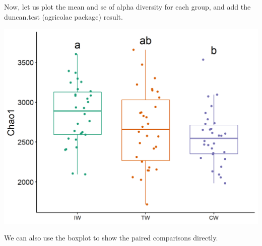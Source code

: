 \documentclass[
]{book}
\newenvironment{Shaded}{\begin{snugshade}}{\end{snugshade}}
\newcommand{\AttributeTok}[1]{\textcolor[rgb]{0.77,0.63,0.00}{#1}}
\newcommand{\ConstantTok}[1]{\textcolor[rgb]{0.00,0.00,0.00}{#1}}
\newcommand{\FunctionTok}[1]{\textcolor[rgb]{0.00,0.00,0.00}{#1}}
\newcommand{\NormalTok}[1]{#1}
\newcommand{\SpecialCharTok}[1]{\textcolor[rgb]{0.00,0.00,0.00}{#1}}
\newcommand{\StringTok}[1]{\textcolor[rgb]{0.31,0.60,0.02}{#1}}
\begin{document}
Now, let us plot the mean and se of alpha diversity for each group, and add the duncan.test (agricolae package) result.

\begin{Shaded}
\end{Shaded}

\begin{center}\includegraphics[width=600px]{Images/plot_alpha_letter} \end{center}

We can also use the boxplot to show the paired comparisons directly.

\begin{Shaded}
\end{Shaded}
\end{document}

